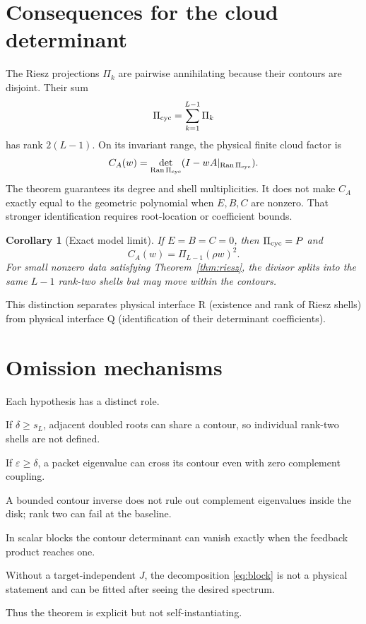 \documentclass[12pt]{article}
\newtheorem{corollary}[theorem]{Corollary}
\theoremstyle{remark}
\newcommand{\Ran}{\operatorname{Ran}}
\begin{document}
\section{Consequences for the cloud determinant}

The Riesz projections $\Pi_k$ are pairwise annihilating because their
contours are disjoint.  Their sum
\[
 \Pi_{\rm cyc}=\sum_{k=1}^{L-1}\Pi_k
\]
has rank $2(L-1)$.  On its invariant range, the physical finite cloud factor
is
\begin{equation}\label{eq:physical-factor}
 C_A(w)=\det_{\Ran\Pi_{\rm cyc}}
 (I-wA|_{\Ran\Pi_{\rm cyc}}).
\end{equation}
The theorem guarantees its degree and shell multiplicities.  It does not make
$C_A$ exactly equal to the geometric polynomial when $E,B,C$ are nonzero.
That stronger identification requires root-location or coefficient bounds.

\begin{corollary}[Exact model limit]
If $E=B=C=0$, then $\Pi_{\rm cyc}=P$ and
\[
 C_A(w)=\Pi_{L-1}(\rho w)^2.
\]
For small nonzero data satisfying Theorem~\ref{thm:riesz}, the divisor splits
into the same $L-1$ rank-two shells but may move within the contours.
\end{corollary}

This distinction separates physical interface R (existence and rank of Riesz
shells) from physical interface Q (identification of their determinant
coefficients).

\section{Omission mechanisms}

Each hypothesis has a distinct role.
\begin{description}[leftmargin=3.5em,style=nextline]
\item[Root spacing.] If $\delta\ge s_L$, adjacent doubled roots can share a
contour, so individual rank-two shells are not defined.
\item[Packet perturbation.] If $\varepsilon\ge\delta$, a packet eigenvalue
can cross its contour even with zero complement coupling.
\item[Complement exclusion.] A bounded contour inverse does not rule out
complement eigenvalues inside the disk; rank two can fail at the baseline.
\item[Directed Schur margin.] In scalar blocks the contour determinant can
vanish exactly when the feedback product reaches one.
\item[Ambient isometry.] Without a target-independent $J$, the decomposition
\eqref{eq:block} is not a physical statement and can be fitted after seeing
the desired spectrum.
\end{description}
Thus the theorem is explicit but not self-instantiating.
\end{document}
